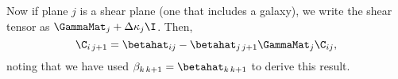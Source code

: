 Now if plane $j$ is a shear plane (one that includes a galaxy), we write the shear tensor as $\GammaMat_j + \Delta \kappa_j \I$. Then,
\begin{equation}
\C_{i \, j +1} = \betahat_{i j}  - \betahat_{j \, j+1} \GammaMat_j \C_{i j},
\end{equation}
noting that we have used $\beta_{k \, k+1} = \betahat_{k\, k+1}$ to derive this result.
  